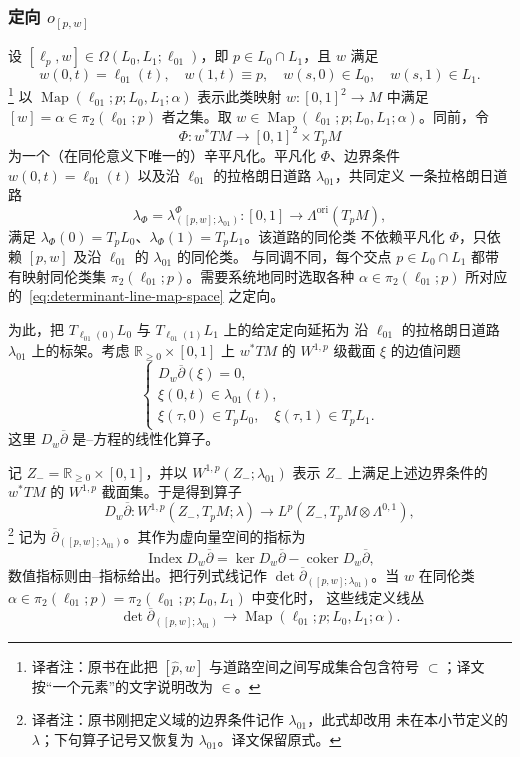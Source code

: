 \subsubsection*{定向 $o_{[p,w]}$}
设 $[\ell_p,w]\in\Omega(L_0,L_1;\ell_{01})$，即 $p\in L_0\cap L_1$，且 $w$ 满足
\[
 w(0,t)=\ell_{01}(t),
 \quad w(1,t)\equiv p,
 \quad w(s,0)\in L_0,
 \quad w(s,1)\in L_1.
\]
\footnote{译者注：原书在此把 $[\widehat p,w]$ 与道路空间之间写成集合包含符号
$\subset$；译文按“一个元素”的文字说明改为 $\in$。}
以 $\operatorname{Map}(\ell_{01};p;L_0,L_1;\alpha)$ 表示此类映射
$w:[0,1]^2\to M$ 中满足
$[w]=\alpha\in\pi_2(\ell_{01};p)$ 者之集。取
$w\in\operatorname{Map}(\ell_{01};p;L_0,L_1;\alpha)$。同前，令
\[
 \Phi:w^*TM\longrightarrow[0,1]^2\times T_pM
\]
为一个（在同伦意义下唯一的）辛平凡化。平凡化 $\Phi$、边界条件
$w(0,t)=\ell_{01}(t)$ 以及沿 $\ell_{01}$ 的拉格朗日道路 $\lambda_{01}$，共同定义
一条拉格朗日道路
\[
 \lambda_\Phi=\lambda^\Phi_{([p,w];\lambda_{01})}:
 [0,1]\longrightarrow\Lambda^{\mathrm{ori}}(T_pM),
\]
满足 $\lambda_\Phi(0)=T_pL_0$、$\lambda_\Phi(1)=T_pL_1$。该道路的同伦类
不依赖平凡化 $\Phi$，只依赖 $[p,w]$ 及沿 $\ell_{01}$ 的 $\lambda_{01}$ 的同伦类。
与\personMorse{}同调不同，每个交点 $p\in L_0\cap L_1$ 都带有映射同伦类集
$\pi_2(\ell_{01};p)$。需要系统地同时选取各种
$\alpha\in\pi_2(\ell_{01};p)$ 所对应的~\eqref{eq:determinant-line-map-space}
之定向。

为此，把 $T_{\ell_{01}(0)}L_0$ 与 $T_{\ell_{01}(1)}L_1$ 上的给定定向延拓为
沿 $\ell_{01}$ 的拉格朗日道路 $\lambda_{01}$ 上的标架。考虑
$\mathbb R_{\geq0}\times[0,1]$ 上 $w^*TM$ 的 $W^{1,p}$ 级截面 $\xi$ 的边值问题
\begin{equation}
 \begin{cases}
 D_w\overline\partial(\xi)=0,\\
 \xi(0,t)\in\lambda_{01}(t),\\
 \xi(\tau,0)\in T_pL_0,
 \quad\xi(\tau,1)\in T_pL_1.
 \end{cases}
 \label{eq:half-strip-orientation-problem}
\end{equation}
这里 $D_w\overline\partial$ 是\personCauchy{}--\personRiemann{}方程的线性化算子。

记 $Z_-=\mathbb R_{\geq0}\times[0,1]$，并以
$W^{1,p}(Z_-;\lambda_{01})$ 表示 $Z_-$ 上满足上述边界条件的 $w^*TM$ 的
$W^{1,p}$ 截面集。于是得到\personFredholm{}算子
\[
 D_w\overline\partial:W^{1,p}(Z_-,T_pM;\lambda)
 \longrightarrow L^p(Z_-,T_pM\otimes\Lambda^{0,1}),
\]
\footnote{译者注：原书刚把定义域的边界条件记作 $\lambda_{01}$，此式却改用
未在本小节定义的 $\lambda$；下句算子记号又恢复为 $\lambda_{01}$。译文保留原式。}
记为 $\overline\partial_{([p,w];\lambda_{01})}$。其作为虚向量空间的指标为
\[
 \operatorname{Index}D_w\overline\partial
 =\ker D_w\overline\partial-\operatorname{coker}D_w\overline\partial,
\]
数值指标则由\personMaslov{}--\personMorse{}指标给出。把行列式线记作
$\det\overline\partial_{([p,w];\lambda_{01})}$。当 $w$ 在同伦类
$\alpha\in\pi_2(\ell_{01};p)=\pi_2(\ell_{01};p;L_0,L_1)$ 中变化时，
这些线定义线丛
\begin{equation}
 \det\overline\partial_{([p,w];\lambda_{01})}
 \longrightarrow\operatorname{Map}(\ell_{01};p;L_0,L_1;\alpha).
 \label{eq:determinant-line-map-space}
\end{equation}

